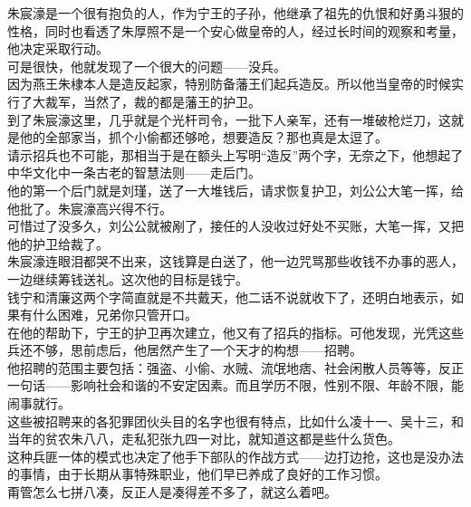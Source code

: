 \begin{multicols}{\theparacolNo}
朱宸濠是一个很有抱负的人，作为宁王的子孙，他继承了祖先的仇恨和好勇斗狠的性格，同时也看透了朱厚照不是一个安心做皇帝的人，经过长时间的观察和考量，他决定采取行动。\\

可是很快，他就发现了一个很大的问题——没兵。\\

因为燕王朱棣本人是造反起家，特别防备藩王们起兵造反。所以他当皇帝的时候实行了大裁军，当然了，裁的都是藩王的护卫。\\

到了朱宸濠这里，几乎就是个光杆司令，一批下人亲军，还有一堆破枪烂刀，这就是他的全部家当，抓个小偷都还够呛，想要造反？那也真是太逗了。\\

请示招兵也不可能，那相当于是在额头上写明“造反”两个字，无奈之下，他想起了中华文化中一条古老的智慧法则——走后门。\\

他的第一个后门就是刘瑾，送了一大堆钱后，请求恢复护卫，刘公公大笔一挥，给他批了。朱宸濠高兴得不行。\\

可惜过了没多久，刘公公就被剐了，接任的人没收过好处不买账，大笔一挥，又把他的护卫给裁了。\\

朱宸濠连眼泪都哭不出来，这钱算是白送了，他一边咒骂那些收钱不办事的恶人，一边继续筹钱送礼。这次他的目标是钱宁。\\

钱宁和清廉这两个字简直就是不共戴天，他二话不说就收下了，还明白地表示，如果有什么困难，兄弟你只管开口。\\

在他的帮助下，宁王的护卫再次建立，他又有了招兵的指标。可他发现，光凭这些兵还不够，思前虑后，他居然产生了一个天才的构想——招聘。\\

他招聘的范围主要包括：强盗、小偷、水贼、流氓地痞、社会闲散人员等等，反正一句话——影响社会和谐的不安定因素。而且学历不限，性别不限、年龄不限，能闹事就行。\\

这些被招聘来的各犯罪团伙头目的名字也很有特点，比如什么凌十一、吴十三，和当年的贫农朱八八，走私犯张九四一对比，就知道这都是些什么货色。\\

这种兵匪一体的模式也决定了他手下部队的作战方式——边打边抢，这也是没办法的事情，由于长期从事特殊职业，他们早已养成了良好的工作习惯。\\

甭管怎么七拼八凑，反正人是凑得差不多了，就这么着吧。\\


\end{multicols}
